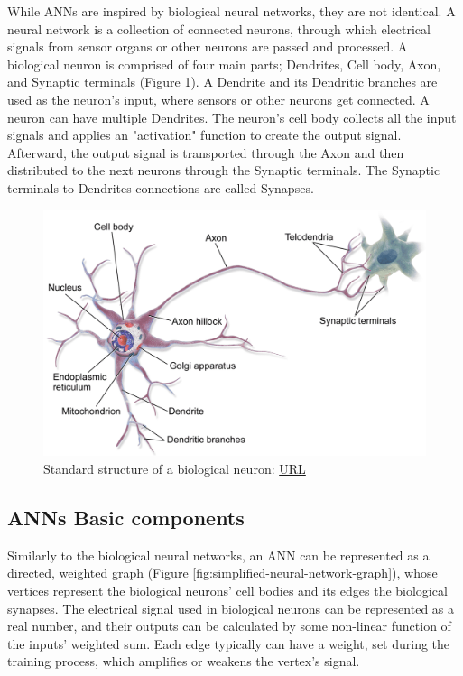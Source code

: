 While ANNs are inspired by biological neural networks, they are not identical. A neural network is a collection of connected neurons, through which electrical signals from sensor organs or other neurons are passed and processed. A biological neuron is comprised of four main parts; Dendrites, Cell body, Axon, and Synaptic terminals (Figure \ref{fig:Standard-structure-of-a-biological-neuron}). A Dendrite and its Dendritic branches are used as the neuron's input, where sensors or other neurons get connected. A neuron can have multiple Dendrites. The neuron's cell body collects all the input signals and applies an "activation" function to create the output signal. Afterward, the output signal is transported through the Axon and then distributed to the next neurons through the Synaptic terminals. The Synaptic terminals to Dendrites connections are called Synapses.

\begin{figure} [ht]
	\centering
	\includegraphics[width=\textwidth]{Images/Biological-Neuron.png}
	\decoRule
	\caption[Standard structure of a biological neuron]{Standard structure of a biological neuron: \href{https://nurseslabs.com/nervous-system/}{URL}}
	\label{fig:Standard-structure-of-a-biological-neuron}
\end{figure}

\subsection{ANNs Basic components}
Similarly to the biological neural networks, an ANN can be represented as a directed, weighted graph (Figure \ref{fig:simplified-neural-network-graph}), whose vertices represent the biological neurons' cell bodies and its edges the biological synapses. The electrical signal used in biological neurons can be represented as a real number, and their outputs can be calculated by some non-linear function of the inputs' weighted sum. Each edge typically can have a weight, set during the training process, which amplifies or weakens the vertex's signal.

